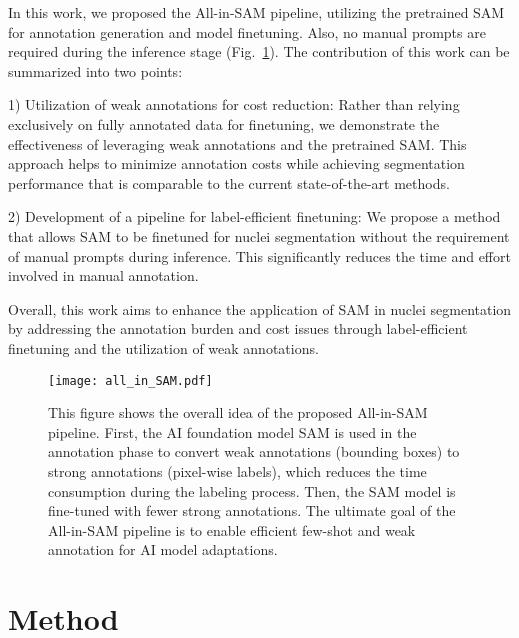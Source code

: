 \documentclass[conference]{IEEEtran}
\begin{document}
In this work, we proposed the All-in-SAM pipeline, utilizing the pretrained SAM for annotation generation and model finetuning. Also, no manual prompts are required during the inference stage (Fig.~\ref{fig0:concept}). The contribution of this work can be summarized into two points:  


1) Utilization of weak annotations for cost reduction: Rather than relying exclusively on fully annotated data for finetuning, we demonstrate the effectiveness of leveraging weak annotations and the pretrained SAM. This approach helps to minimize annotation costs while achieving segmentation performance that is comparable to the current state-of-the-art methods.

2) Development of a pipeline for label-efficient finetuning: We propose a method that allows SAM to be finetuned for nuclei segmentation without the requirement of manual prompts during inference. This significantly reduces the time and effort involved in manual annotation. 


Overall, this work aims to enhance the application of SAM in nuclei segmentation by addressing the annotation burden and cost issues through label-efficient finetuning and the utilization of weak annotations.

\begin{figure}[t]
\begin{center}
\texttt{[image: all\_in\_SAM.pdf]}
\end{center}
   \caption{This figure shows the overall idea of the proposed All-in-SAM pipeline. First, the AI foundation model SAM is used in the annotation phase to convert weak annotations (bounding boxes) to strong annotations (pixel-wise labels), which reduces the time consumption during the labeling process. Then, the SAM model is fine-tuned with fewer strong annotations. The ultimate goal of the All-in-SAM pipeline is to enable efficient few-shot and weak annotation for AI model adaptations.}
\label{fig0:concept}
\end{figure}


\section{Method} \label{Method}
\end{document}
